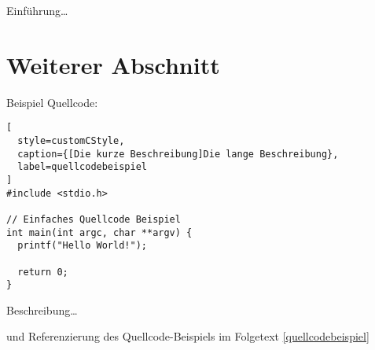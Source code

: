 
Einführung\ldots

\section{Weiterer Abschnitt}

Beispiel Quellcode:

\begin{lstlisting}[
  style=customCStyle,
  caption={[Die kurze Beschreibung]Die lange Beschreibung},
  label=quellcodebeispiel
]
#include <stdio.h>

// Einfaches Quellcode Beispiel
int main(int argc, char **argv) {
  printf("Hello World!");

  return 0;
}
\end{lstlisting}

Beschreibung\ldots

und Referenzierung des Quellcode-Beispiels im Folgetext \autoref{quellcodebeispiel}
